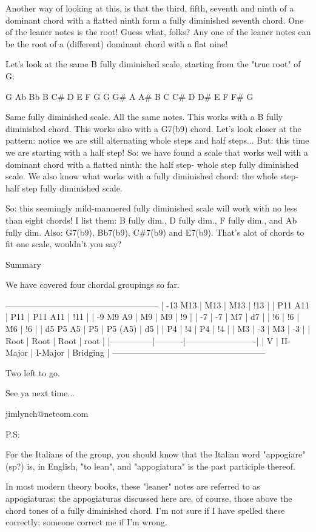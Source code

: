 Another way of looking at this, is that the third, fifth, seventh and ninth
of a dominant chord with a flatted ninth form a fully diminished seventh
chord. One of the leaner notes is the root! Guess what, folks? Any one of the
leaner notes can be the root of a (different) dominant chord with a flat nine!

Let's look at the same B fully diminished scale, starting from the "true root"
of G:

G    Ab        Bb   B         C\#   D         E    F         G
G    G\#   A    A\#   B    C    C\#   D    D\#   E    F    F\#   G

Same fully diminished scale. All the same notes. This works with a B fully
diminished chord. This works also with a G7(b9) chord. Let's look closer at
the pattern: notice we are still alternating whole steps and half steps...
But: this time we are starting with a half step! So: we have found a scale
that works well with a dominant chord with a flatted ninth: the half step-
whole step fully diminished scale. We also know what works with a fully
diminished chord: the whole step-half step fully diminished scale.

So: this seemingly mild-mannered fully diminished scale will work with no less
than eight chords! I list them: B fully dim., D fully dim., F fully dim., and
Ab fully dim. Also: G7(b9), Bb7(b9), C\#7(b9) and E7(b9). That's alot of chords
to fit one scale, wouldn't you say?

Summary

We have covered four chordal groupings so far.

------------------------------------------------------
| -13  M13      |   M13    |  M13       |    !13     |
|      P11  A11 |   P11    |  P11  A11  |    !11     |
|  -9   M9   A9 |    M9    |   M9       |     !9     |
|       -7      |    -7    |   M7       |     d7     |
|       !6      |    !6    |   M6       |     !6     |
|  d5   P5   A5 |    P5    |   P5 (A5)  |     d5     |
|       P4      |    !4    |   P4       |     !4     |
|       M3      |    -3    |   M3       |     -3     |
|      Root     |   Root   |  Root      |    root    |
|---------------|----------|-------------------------|
|        V      | II-Major | I-Major    |  Bridging  |
------------------------------------------------------

Two left to go.

See ya next time...

jimlynch@netcom.com

P.S:

For the Italians of the group, you should know that the
Italian word "appogiare" (sp?) is, in English, "to lean",
and "appogiatura" is the past participle thereof.

In most modern theory books, these "leaner" notes are
referred to as appogiaturas; the appogiaturas discussed
here are, of course, those above the chord tones of a
fully diminished chord. I'm not sure if I have spelled
these correctly; someone correct me if I'm wrong.

